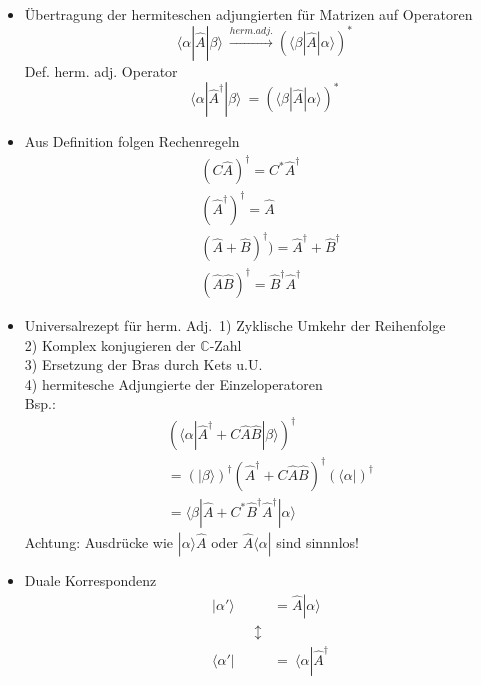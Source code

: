 \documentclass[10pt,article,colorback,accentcolor=tud9d]{scrartcl}
\begin{document}
\begin{itemize}
\item Übertragung der hermiteschen adjungierten für Matrizen auf Operatoren
  \begin{equation}
  \langle \alpha\left|\right.\hat{A}\left|\right.\beta\rangle  \ \xrightarrow{herm. adj.} (\langle 
\beta \left|\right.\hat{A}\left|\right.\alpha\rangle )^*
  \end{equation}
  Def. herm. adj. Operator
  \begin{equation}
  \langle \alpha\left|\right.{\hat{A}}^{\dagger} \left|\right. \beta\rangle  \ =(\langle \beta\left|\right.
\hat{A}\left|\right.\alpha\rangle )^*
  \end{equation}
\item Aus Definition folgen Rechenregeln
  \begin{equation}
  \begin{aligned}
  &(C\hat{A})^{\dagger}=C^*{\hat{A}}^{\dagger}\\
  &({\hat{A}}^{\dagger})^{\dagger}=\hat{A}\\
  &(\hat{A} + \hat{B})^{\dagger} )= \hat{A}^{\dagger} + \hat{B}^{\dagger}\\
  &(\hat{A}\hat{B})^{\dagger}=\hat{B}^{\dagger}\hat{A}^{\dagger}
  \end{aligned}
  \end{equation}
\item  Universalrezept für herm. Adj.\
  1) Zyklische Umkehr der Reihenfolge\\
  2) Komplex konjugieren der $\mathbb{C}$-Zahl\\
  3) Ersetzung der Bras durch Kets u.U.\\
  4) hermitesche Adjungierte der Einzeloperatoren\\
  Bsp.:
  \begin{equation}
  \begin{aligned}
  &(\langle \alpha\left|\right.\hat{A}^{\dagger}+C\hat{A}\hat{B}\left|\right.\beta\rangle )^{\dagger}\\
  &= (\left|\right.\beta\rangle )^{\dagger} (\hat{A}^{\dagger}+C\hat{A}\hat{B})^{\dagger}(\langle \alpha\left|\right
.)^{\dagger}\\
  &= \langle \beta\left|\right. \hat{A} +C^*\hat{B}^{\dagger} \hat{A}^{\dagger} \left|\right.\alpha\rangle 
  \end{aligned}
  \end{equation}
  Achtung: Ausdrücke wie $\left.\right|\alpha\rangle \hat{A}$ oder $ \hat{A}\langle \alpha\left|\right.$ 
sind sinnnlos!
\item Duale Korrespondenz
  \begin{equation}
  \begin{aligned}
  &\left|\right.\alpha'\rangle &=\hat{A}\left|\right.\alpha\rangle \\
  & \quad \quad \quad \updownarrow&\\
  &\langle \alpha'\left|\right.&= \ \langle \alpha\left|\right.\hat{A}^{\dagger}
  \end{aligned}
  \end{equation}
\end{itemize}
\end{document}
